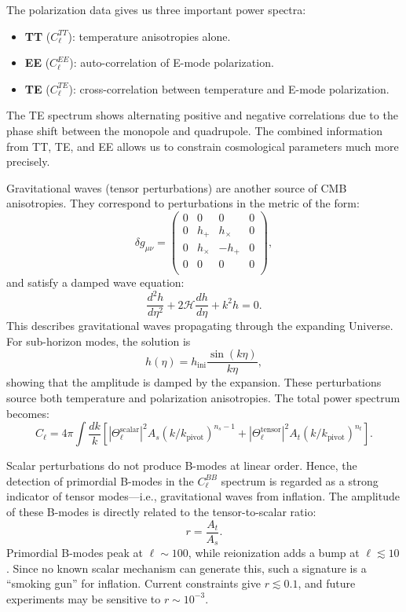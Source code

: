 \documentclass{aa}
\numberwithin{equation}{section}
\numberwithin{table}{section}
\numberwithin{figure}{section}
\begin{document}
The polarization data gives us three important power spectra:
\begin{itemize}
  \item \textbf{TT} ($C_\ell^{TT}$): temperature anisotropies alone.
  \item \textbf{EE} ($C_\ell^{EE}$): auto-correlation of E-mode polarization.
  \item \textbf{TE} ($C_\ell^{TE}$): cross-correlation between temperature and E-mode polarization.
\end{itemize}
The TE spectrum shows alternating positive and negative correlations due to the phase shift between the monopole and quadrupole. The combined information from TT, TE, and EE allows us to constrain cosmological parameters much more precisely.


Gravitational waves (tensor perturbations) are another source of CMB anisotropies. They correspond to perturbations in the metric of the form:
\begin{equation}
\delta g_{\mu\nu} = 
\begin{pmatrix}
0 & 0 & 0 & 0 \\
0 & h_+ & h_\times & 0 \\
0 & h_\times & -h_+ & 0 \\
0 & 0 & 0 & 0 \\
\end{pmatrix},
\end{equation}
and satisfy a damped wave equation:
\begin{equation}
\frac{d^2 h}{d\eta^2} + 2\mathcal{H} \frac{dh}{d\eta} + k^2 h = 0.
\end{equation}
This describes gravitational waves propagating through the expanding Universe. For sub-horizon modes, the solution is
\begin{equation}
h(\eta) = h_{\text{ini}} \frac{\sin(k\eta)}{k\eta},
\end{equation}
showing that the amplitude is damped by the expansion. These perturbations source both temperature and polarization anisotropies. The total power spectrum becomes:
\begin{equation}
C_\ell = 4\pi \int \frac{dk}{k} \left[ |\Theta_\ell^{\text{scalar}}|^2 A_s(k/k_\text{pivot})^{n_s - 1} + |\Theta_\ell^{\text{tensor}}|^2 A_t(k/k_\text{pivot})^{n_t} \right].
\end{equation}

Scalar perturbations do not produce B-modes at linear order. Hence, the detection of primordial B-modes in the $C_\ell^{BB}$ spectrum is regarded as a strong indicator of tensor modes—i.e., gravitational waves from inflation. The amplitude of these B-modes is directly related to the tensor-to-scalar ratio:
\begin{equation}
r = \frac{A_t}{A_s}.
\end{equation}
Primordial B-modes peak at $\ell \sim 100$, while reionization adds a bump at $\ell \lesssim 10$. Since no known scalar mechanism can generate this, such a signature is a ``smoking gun'' for inflation. Current constraints give $r \lesssim 0.1$, and future experiments may be sensitive to $r \sim 10^{-3}$. 
\end{document}

